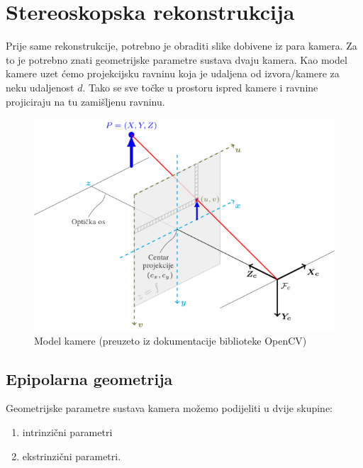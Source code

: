 \documentclass[utf8, zavrsni, numeric]{fer}
\begin{document}
\chapter{Stereoskopska rekonstrukcija}

Prije same rekonstrukcije, potrebno je obraditi slike dobivene iz para kamera. Za to je potrebno znati geometrijske parametre sustava dvaju kamera. Kao model kamere uzet ćemo
projekcijsku ravninu koja je udaljena od izvora/kamere za neku udaljenost $d$. Tako se sve točke u prostoru ispred kamere i ravnine projiciraju na tu zamišljenu ravninu.

\begin{figure}[htb]
  \centering
  \includegraphics[width=13cm]{img/pinhole_camera_model.png}
  \caption{Model kamere (preuzeto iz dokumentacije biblioteke OpenCV)}
  \label{fig:model-kamere}
\end{figure}


\section{Epipolarna geometrija}


Geometrijske parametre sustava kamera možemo podijeliti u dvije skupine:
\begin{enumerate}
  \item intrinzični parametri
  \item ekstrinzični parametri.
\end{enumerate}
\end{document}
